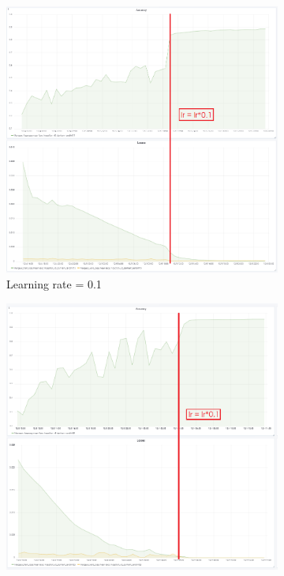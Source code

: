 \begin{figure}
\begin{subfigure}{.6\textwidth}
  \centering
  \includegraphics[width=1\linewidth]{figures/04-opt_dunham_01.PNG}
  \caption{Learning rate = 0.1}
  \label{fig:optim_01}
\end{subfigure}%
\begin{subfigure}{.6\textwidth}
  \centering
  \includegraphics[width=1\linewidth]{figures/04-opt_dunham_001.PNG}

\end{subfigure}
\end{figure}
